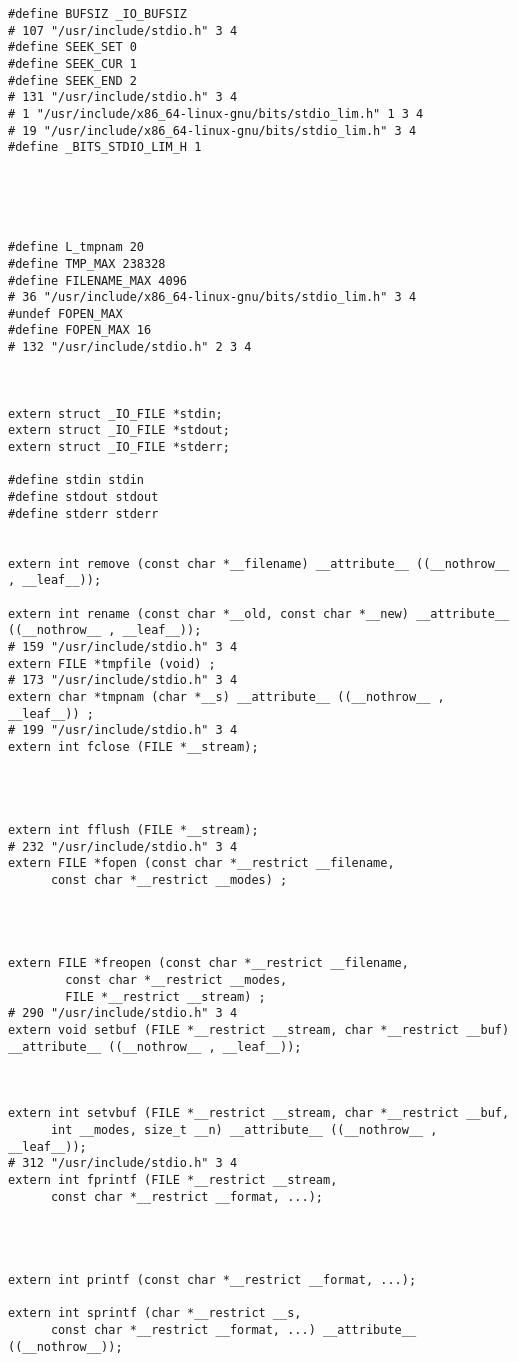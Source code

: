 \documentclass[11pt]{article}
\begin{document}
\begin{enumerate}
\begin{verbatim}
#define BUFSIZ _IO_BUFSIZ
# 107 "/usr/include/stdio.h" 3 4
#define SEEK_SET 0
#define SEEK_CUR 1
#define SEEK_END 2
# 131 "/usr/include/stdio.h" 3 4
# 1 "/usr/include/x86_64-linux-gnu/bits/stdio_lim.h" 1 3 4
# 19 "/usr/include/x86_64-linux-gnu/bits/stdio_lim.h" 3 4
#define _BITS_STDIO_LIM_H 1





#define L_tmpnam 20
#define TMP_MAX 238328
#define FILENAME_MAX 4096
# 36 "/usr/include/x86_64-linux-gnu/bits/stdio_lim.h" 3 4
#undef FOPEN_MAX
#define FOPEN_MAX 16
# 132 "/usr/include/stdio.h" 2 3 4



extern struct _IO_FILE *stdin;
extern struct _IO_FILE *stdout;
extern struct _IO_FILE *stderr;

#define stdin stdin
#define stdout stdout
#define stderr stderr


extern int remove (const char *__filename) __attribute__ ((__nothrow__ , __leaf__));

extern int rename (const char *__old, const char *__new) __attribute__ ((__nothrow__ , __leaf__));
# 159 "/usr/include/stdio.h" 3 4
extern FILE *tmpfile (void) ;
# 173 "/usr/include/stdio.h" 3 4
extern char *tmpnam (char *__s) __attribute__ ((__nothrow__ , __leaf__)) ;
# 199 "/usr/include/stdio.h" 3 4
extern int fclose (FILE *__stream);




extern int fflush (FILE *__stream);
# 232 "/usr/include/stdio.h" 3 4
extern FILE *fopen (const char *__restrict __filename,
      const char *__restrict __modes) ;




extern FILE *freopen (const char *__restrict __filename,
        const char *__restrict __modes,
        FILE *__restrict __stream) ;
# 290 "/usr/include/stdio.h" 3 4
extern void setbuf (FILE *__restrict __stream, char *__restrict __buf) __attribute__ ((__nothrow__ , __leaf__));



extern int setvbuf (FILE *__restrict __stream, char *__restrict __buf,
      int __modes, size_t __n) __attribute__ ((__nothrow__ , __leaf__));
# 312 "/usr/include/stdio.h" 3 4
extern int fprintf (FILE *__restrict __stream,
      const char *__restrict __format, ...);




extern int printf (const char *__restrict __format, ...);

extern int sprintf (char *__restrict __s,
      const char *__restrict __format, ...) __attribute__ ((__nothrow__));






\end{verbatim}
\end{enumerate}
\end{document}
